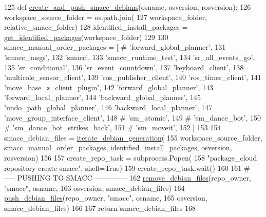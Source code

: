 \begin{DoxyCode}
125 \textcolor{keyword}{def }\hyperlink{namespacegenerate__debs_af7237c463c8e5b4df369e6befc154c50}{create\_and\_push\_smacc\_debians}(osname, osversion, rosversion):
126     workspace\_source\_folder = os.path.join(
127         workspace\_folder, relative\_smacc\_folder)
128     identified\_install\_packages = \hyperlink{namespacegenerate__debs_aa91b87c6d9c3ed04015845cc9298431a}{get\_identified\_packages}(workspace\_folder)
129 
130     smacc\_manual\_order\_packages = [  \textcolor{comment}{# 'forward\_global\_planner',}
131         \textcolor{stringliteral}{'smacc\_msgs'},
132         \textcolor{stringliteral}{'smacc'},
133         \textcolor{stringliteral}{'smacc\_runtime\_test'},
134         \textcolor{stringliteral}{'sr\_all\_events\_go'},
135          \textcolor{stringliteral}{'sr\_conditional'},
136          \textcolor{stringliteral}{'sr\_event\_countdown'},
137          \textcolor{stringliteral}{'keyboard\_client'},
138          \textcolor{stringliteral}{'multirole\_sensor\_client'},
139          \textcolor{stringliteral}{'ros\_publisher\_client'},
140          \textcolor{stringliteral}{'ros\_timer\_client'},
141          \textcolor{stringliteral}{'move\_base\_z\_client\_plugin'},
142          \textcolor{stringliteral}{'forward\_global\_planner'},
143          \textcolor{stringliteral}{'forward\_local\_planner'},
144          \textcolor{stringliteral}{'backward\_global\_planner'},
145          \textcolor{stringliteral}{'undo\_path\_global\_planner'},
146          \textcolor{stringliteral}{'backward\_local\_planner'},        
147          \textcolor{stringliteral}{'move\_group\_interface\_client'},
148         \textcolor{comment}{# 'sm\_atomic',}
149         \textcolor{comment}{# 'sm\_dance\_bot',}
150         \textcolor{comment}{# 'sm\_dance\_bot\_strikes\_back',}
151         \textcolor{comment}{# 'sm\_moveit',}
152     ]
153 
154     smacc\_debian\_files = \hyperlink{namespacegenerate__debs_a2615a6fc7860b6aa9e920e6b4d886589}{iterate\_debian\_generation}(
155         workspace\_source\_folder, smacc\_manual\_order\_packages, identified\_install\_packages, osversion, 
      rosversion)
156 
157     create\_repo\_task = subprocess.Popen(
158         \textcolor{stringliteral}{"package\_cloud repository create smacc"}, shell=\textcolor{keyword}{True})
159     create\_repo\_task.wait()
160 
161     \textcolor{comment}{# ----- PUSHING TO SMACC --------------}
162     \hyperlink{namespacegenerate__debs_a08095040d038b3613ad0e77fd4e7f60e}{remove\_debian\_files}(repo\_owner, \textcolor{stringliteral}{"smacc"},  osname,
163                         osversion, smacc\_debian\_files)
164     \hyperlink{namespacegenerate__debs_a9b22f5ad65b40b7903c467eda308e575}{push\_debian\_files}(repo\_owner, \textcolor{stringliteral}{"smacc"},  osname,
165                       osversion, smacc\_debian\_files)
166 
167     \textcolor{keywordflow}{return} smacc\_debian\_files
168 
\end{DoxyCode}
